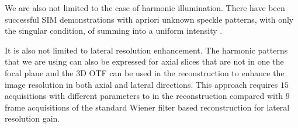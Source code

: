 We are also not limited to the case of harmonic illumination.
There have been successful \ac{SIM} demonstrations with apriori unknown speckle patterns, with only the singular 
    condition, of summing into a uniform intensity .

It is also not limited to lateral resolution enhancement.
The harmonic patterns that we are using can also be expressed for axial slices that are not in one the focal plane and 
    the \(3\)D \ac{OTF} can be used in the reconstruction to enhance the image resolution in both axial and lateral 
    directions.
This approach requires \(15\) acquisitions with different parameters to in the reconstruction compared with \(9\) frame
    acquisitions of the standard Wiener filter based reconstruction for lateral resolution gain.

